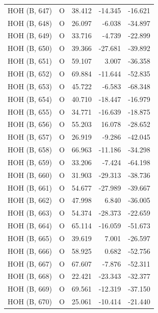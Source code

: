 \begin{longtable}{@{}lcrr@{}}
  \cmidrule(r){1-5}
  HOH (B, 647) & O & 38.412 & -14.345 & -16.621 \\
  \cmidrule(r){1-5}
  HOH (B, 648) & O & 26.097 & -6.038 & -34.897 \\
  \cmidrule(r){1-5}
  HOH (B, 649) & O & 33.716 & -4.739 & -22.899 \\
  \cmidrule(r){1-5}
  HOH (B, 650) & O & 39.366 & -27.681 & -39.892 \\
  \cmidrule(r){1-5}
  HOH (B, 651) & O & 59.107 & 3.007 & -36.358 \\
  \cmidrule(r){1-5}
  HOH (B, 652) & O & 69.884 & -11.644 & -52.835 \\
  \cmidrule(r){1-5}
  HOH (B, 653) & O & 45.722 & -6.583 & -68.348 \\
  \cmidrule(r){1-5}
  HOH (B, 654) & O & 40.710 & -18.447 & -16.979 \\
  \cmidrule(r){1-5}
  HOH (B, 655) & O & 34.771 & -16.639 & -18.875 \\
  \cmidrule(r){1-5}
  HOH (B, 656) & O & 55.203 & 16.078 & -28.652 \\
  \cmidrule(r){1-5}
  HOH (B, 657) & O & 26.919 & -9.286 & -42.045 \\
  \cmidrule(r){1-5}
  HOH (B, 658) & O & 66.963 & -11.186 & -34.298 \\
  \cmidrule(r){1-5}
  HOH (B, 659) & O & 33.206 & -7.424 & -64.198 \\
  \cmidrule(r){1-5}
  HOH (B, 660) & O & 31.903 & -29.313 & -38.736 \\
  \cmidrule(r){1-5}
  HOH (B, 661) & O & 54.677 & -27.989 & -39.667 \\
  \cmidrule(r){1-5}
  HOH (B, 662) & O & 47.998 & 6.840 & -36.005 \\
  \cmidrule(r){1-5}
  HOH (B, 663) & O & 54.374 & -28.373 & -22.659 \\
  \cmidrule(r){1-5}
  HOH (B, 664) & O & 65.114 & -16.059 & -51.673 \\
  \cmidrule(r){1-5}
  HOH (B, 665) & O & 39.619 & 7.001 & -26.597 \\
  \cmidrule(r){1-5}
  HOH (B, 666) & O & 58.925 & 0.682 & -52.756 \\
  \cmidrule(r){1-5}
  HOH (B, 667) & O & 67.607 & -7.876 & -52.311 \\
  \cmidrule(r){1-5}
  HOH (B, 668) & O & 22.421 & -23.343 & -32.377 \\
  \cmidrule(r){1-5}
  HOH (B, 669) & O & 69.561 & -12.319 & -37.150 \\
  \cmidrule(r){1-5}
  HOH (B, 670) & O & 25.061 & -10.414 & -21.440 \\

\end{longtable}
